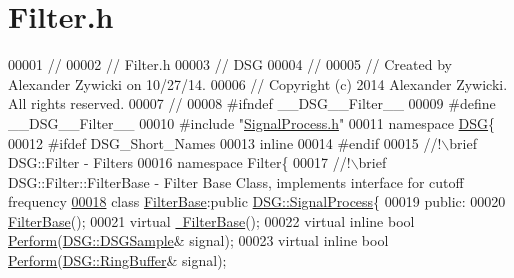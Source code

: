 \hypertarget{_filter_8h_source}{\section{Filter.\+h}
\label{_filter_8h_source}
}

\begin{DoxyCode}
00001 \textcolor{comment}{//}
00002 \textcolor{comment}{//  Filter.h}
00003 \textcolor{comment}{//  DSG}
00004 \textcolor{comment}{//}
00005 \textcolor{comment}{//  Created by Alexander Zywicki on 10/27/14.}
00006 \textcolor{comment}{//  Copyright (c) 2014 Alexander Zywicki. All rights reserved.}
00007 \textcolor{comment}{//}
00008 \textcolor{preprocessor}{#ifndef \_\_DSG\_\_Filter\_\_}
00009 \textcolor{preprocessor}{#define \_\_DSG\_\_Filter\_\_}
00010 \textcolor{preprocessor}{#include "\hyperlink{_signal_process_8h}{SignalProcess.h}"}
00011 \textcolor{keyword}{namespace }\hyperlink{namespace_d_s_g}{DSG}\{
00012 \textcolor{preprocessor}{#ifdef DSG\_Short\_Names}
00013     \textcolor{keyword}{inline}
00014 \textcolor{preprocessor}{#endif}
00015 \textcolor{comment}{    //!\(\backslash\)brief DSG::Filter - Filters}
00016 \textcolor{comment}{}    \textcolor{keyword}{namespace }Filter\{\textcolor{comment}{}
00017 \textcolor{comment}{        //!\(\backslash\)brief DSG::Filter::FilterBase - Filter Base Class, implements interface for cutoff frequency}
\hypertarget{_filter_8h_source_l00018}{}\hyperlink{class_d_s_g_1_1_filter_1_1_filter_base}{00018} \textcolor{comment}{}        \textcolor{keyword}{class }\hyperlink{class_d_s_g_1_1_filter_1_1_filter_base}{FilterBase}:\textcolor{keyword}{public} \hyperlink{class_d_s_g_1_1_signal_process}{DSG::SignalProcess}\{
00019         \textcolor{keyword}{public}:
00020             \hyperlink{class_d_s_g_1_1_filter_1_1_filter_base_accc0a6729e252abaa24ad7f72b2f351d}{FilterBase}();
00021             \textcolor{keyword}{virtual} \hyperlink{class_d_s_g_1_1_filter_1_1_filter_base_a1e220c7fe383eba4822f3896d8b2c2b2}{~FilterBase}();
00022             \textcolor{keyword}{virtual} \textcolor{keyword}{inline} \textcolor{keywordtype}{bool} \hyperlink{class_d_s_g_1_1_filter_1_1_filter_base_ae7b6f59f5408ecab3ccd6c4e723c70b4}{Perform}(\hyperlink{namespace_d_s_g_ac39a94cd27ebcd9c1e7502d0c624894a}{DSG::DSGSample}& signal);
00023             \textcolor{keyword}{virtual} \textcolor{keyword}{inline} \textcolor{keywordtype}{bool} \hyperlink{class_d_s_g_1_1_filter_1_1_filter_base_ae7b6f59f5408ecab3ccd6c4e723c70b4}{Perform}(\hyperlink{class_d_s_g_1_1_ring_buffer}{DSG::RingBuffer}& signal);

\end{DoxyCode}
